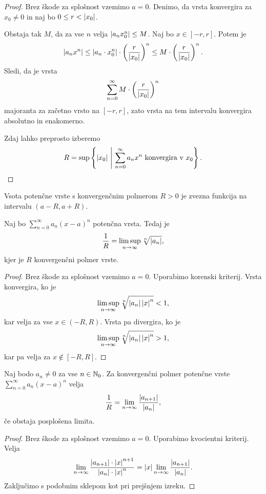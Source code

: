 \documentclass[12pt, a4paper]{article}
\begin{document}
\begin{proof}
Brez škode za splošnost vzemimo $a=0$. Denimo, da vrsta konvergira za $x_0\ne 0$ in naj bo $0\leq r<\left\lvert x_0\right\rvert$.

Obstaja tak $M$, da za vse $n$ velja $\left\lvert a_nx_0^n\right\rvert\leq M$. Naj bo $x\in[-r,r]$. Potem je
\[
\left\lvert a_nx^n\right\rvert\leq\left\lvert a_n\cdot x_0^n\right\rvert\cdot\left(\frac{r}{\left\lvert x_0\right\rvert}\right)^n\leq M\cdot\left(\frac{r}{\left\lvert x_0\right\rvert}\right)^n.
\]
Sledi, da je vrsta
\[
\sum_{n=0}^\infty M\cdot\left(\frac{r}{\left\lvert x_0\right\rvert}\right)^n
\]
majoranta za začetno vrsto na $[-r,r]$, zato vrsta na tem intervalu konvergira absolutno in enakomerno.

Zdaj lahko preprosto izberemo
\[
R=\sup\left\{\left\lvert x_0\right\rvert~\middle\vert~\sum_{n=0}^\infty a_nx^n~\text{konvergira v}~x_0\right\}.\qedhere
\]
\end{proof}

\begin{posledica}
Vsota potenčne vrste s konvergenčnim polmerom $R>0$ je zvezna funkcija na intervalu $(a-R,a+R)$.
\end{posledica}

\begin{izrek}
Naj bo $\displaystyle\sum_{n=0}^\infty a_n(x-a)^n$ potenčna vrsta. Tedaj je
\[
\frac{1}{R}=\limsup_{n\to\infty}\sqrt[n]{\left\lvert a_n\right\rvert},
\]
kjer je $R$ konvergenčni polmer vrste.
\end{izrek}

\begin{proof}
Brez škode za splošnost vzemimo $a=0$. Uporabimo korenski kriterij. Vrsta konvergira, ko je
\[
\limsup_{n\to\infty}\sqrt[n]{\left\lvert a_n\right\rvert\left\lvert x\right\rvert^n}<1,
\]
kar velja za vse $x\in(-R,R)$. Vrsta pa divergira, ko je
\[
\limsup_{n\to\infty}\sqrt[n]{\left\lvert a_n\right\rvert\left\lvert x\right\rvert^n}>1,
\]
kar pa velja za $x\not\in[-R,R]$.
\end{proof}

\begin{trditev}
Naj bodo $a_n\ne 0$ za vse $n\in\mathbb{N}_0$. Za konvergenčni polmer potenčne vrste $\displaystyle\sum_{n=0}^\infty a_n(x-a)^n$ velja
\[
\frac{1}{R}=\lim_{n\to\infty}\frac{\left\lvert a_{n+1}\right\rvert}{\left\lvert a_n\right\rvert},
\]
če obstaja posplošena limita.
\end{trditev}

\begin{proof}
Brez škode za splošnost vzemimo $a=0$. Uporabimo kvocientni kriterij. Velja
\[
\lim_{n\to\infty}\frac{\left\lvert a_{n+1}\right\rvert\cdot\left\lvert x\right\rvert^{n+1}}{\left\lvert a_n\right\rvert\cdot\left\lvert x\right\rvert^n}=\left\lvert x\right\rvert\lim_{n\to\infty}\frac{\left\lvert a_{n+1}\right\rvert}{\left\lvert a_n\right\rvert}.
\]
Zaključimo s podobnim sklepom kot pri prejšnjem izreku.
\end{proof}
\end{document}
